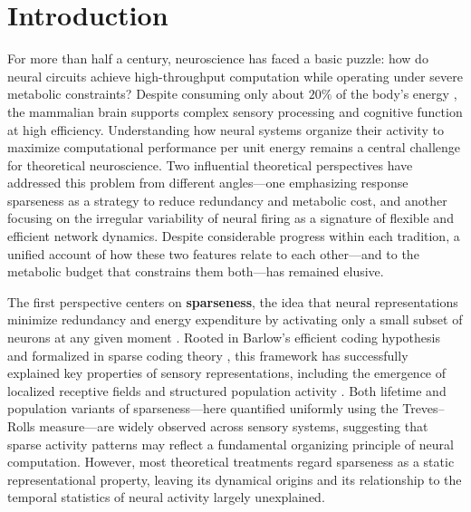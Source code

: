 \documentclass[sn-basic,Numbered]{sn-jnl}%
\theoremstyle{thmstyleone}%
\theoremstyle{thmstyletwo}%
\theoremstyle{thmstylethree}%
\begin{document}
\section{Introduction}\label{sec1}


For more than half a century, neuroscience has faced a basic puzzle: how do neural circuits achieve high-throughput computation while operating under severe metabolic constraints? Despite consuming only about $20\%$ of the body's energy \cite{lennie2003cost,31,32}, the mammalian brain supports complex sensory processing and cognitive function at high efficiency. Understanding how neural systems organize their activity to maximize computational performance per unit energy remains a central challenge for theoretical neuroscience. Two influential theoretical perspectives have addressed this problem from different angles---one emphasizing response sparseness as a strategy to reduce redundancy and metabolic cost, and another focusing on the irregular variability of neural firing as a signature of flexible and efficient network dynamics. Despite considerable progress within each tradition, a unified account of how these two features relate to each other---and to the metabolic budget that constrains them both---has remained elusive.

The first perspective centers on \textbf{sparseness}, the idea that neural representations minimize redundancy and energy expenditure by activating only a small subset of neurons at any given moment \cite{1,2,3,20}. Rooted in Barlow’s efficient coding hypothesis \cite{30} and formalized in sparse coding theory \cite{13,field_relations_1987}, this framework has successfully explained key properties of sensory representations, including the emergence of localized receptive fields \cite{hubel_receptive_1962,20} and structured population activity \cite{15,22,25}. Both lifetime and population variants of sparseness---here quantified uniformly using the Treves--Rolls measure---are widely observed across sensory systems, suggesting that sparse activity patterns may reflect a fundamental organizing principle of neural computation. However, most theoretical treatments regard sparseness as a static representational property, leaving its dynamical origins and its relationship to the temporal statistics of neural activity largely unexplained.
\end{document}
